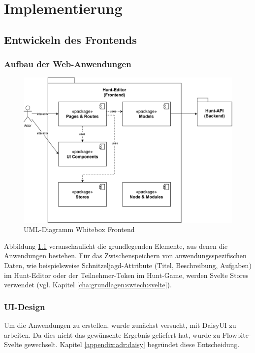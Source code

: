 \chapter{Implementierung} \label{cha:implementierung}

\section{Entwickeln des Frontends}

\subsection{Aufbau der Web-Anwendungen}

\begin{figure}[H]
  \centering
  \includegraphics[width=1\textwidth]{images/PrAR-Loesung-Hunt-Editor-Components.png}
  \caption{UML-Diagramm Whitebox Frontend}
  \label{fig:whitebox-frontend}
\end{figure}

Abbildung \ref{fig:whitebox-frontend} veranschaulicht die grundlegenden Elemente, aus denen die Anwendungen bestehen. Für das Zwischenspeichern von anwendungsspezifischen Daten, wie beispielsweise Schnitzeljagd-Attribute (Titel, Beschreibung, Aufgaben) im Hunt-Editor oder der Teilnehmer-Token im Hunt-Game, werden Svelte Stores verwendet (vgl. Kapitel \ref{cha:grundlagen:swtech:svelte}).

\subsection{UI-Design}

Um die Anwendungen zu erstellen, wurde zunächst versucht, mit DaisyUI zu arbeiten. Da dies nicht das gewünschte Ergebnis geliefert hat, wurde zu Flowbite-Svelte gewechselt. Kapitel \ref{appendix:adr:daisy} begründet diese Entscheidung.


